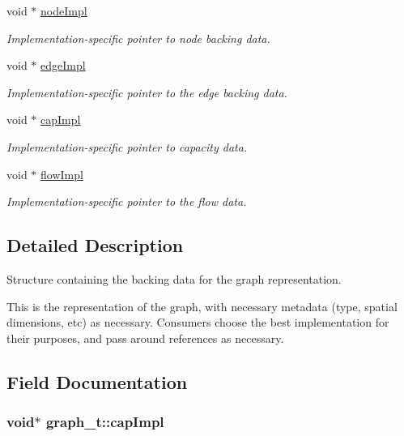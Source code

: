 \begin{DoxyCompactItemize}
void $\ast$ \hyperlink{structgraph__t_a3bf6344f03f4cbc69345d026da2e3368}{node\+Impl}
\begin{DoxyCompactList}\small\item\em Implementation-\/specific pointer to node backing data. \end{DoxyCompactList}\item 
void $\ast$ \hyperlink{structgraph__t_acadea26a56e788cb109413045138faba}{edge\+Impl}
\begin{DoxyCompactList}\small\item\em Implementation-\/specific pointer to the edge backing data. \end{DoxyCompactList}\item 
void $\ast$ \hyperlink{structgraph__t_ab85359c7dfbc46f84976a85c4104b1f5}{cap\+Impl}
\begin{DoxyCompactList}\small\item\em Implementation-\/specific pointer to capacity data. \end{DoxyCompactList}\item 
void $\ast$ \hyperlink{structgraph__t_aff85993441e72a7815da3fa1b048e5eb}{flow\+Impl}
\begin{DoxyCompactList}\small\item\em Implementation-\/specific pointer to the flow data. \end{DoxyCompactList}\end{DoxyCompactItemize}


\subsection{Detailed Description}
Structure containing the backing data for the graph representation. 

This is the representation of the graph, with necessary metadata (type, spatial dimensions, etc) as necessary. Consumers choose the best implementation for their purposes, and pass around references as necessary. 

\subsection{Field Documentation}
\subsubsection[{\texorpdfstring{cap\+Impl}{capImpl}}]{\setlength{\rightskip}{0pt plus 5cm}void$\ast$ graph\+\_\+t\+::cap\+Impl}\hypertarget{structgraph__t_ab85359c7dfbc46f84976a85c4104b1f5}{}\label{structgraph__t_ab85359c7dfbc46f84976a85c4104b1f5}


